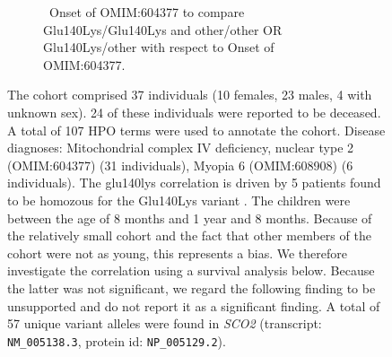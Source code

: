 \begin{figure}[htbp]
\vspace{2em}

\begin{subfigure}[b]{0.95\textwidth}
\captionsetup{justification=raggedright,singlelinecheck=false}
\caption{ Onset of OMIM:604377 to compare Glu140Lys/Glu140Lys and other/other OR Glu140Lys/other with respect to Onset of OMIM:604377. }
\end{subfigure}

\vspace{2em}

\caption{ The cohort comprised 37 individuals (10 females, 23 males, 4 with unknown sex). 24 of these individuals were reported to be deceased. 
A total of 107 HPO terms were used to annotate the cohort. Disease diagnoses: Mitochondrial complex IV deficiency, nuclear type 2 (OMIM:604377) (31 individuals), 
Myopia 6 (OMIM:608908) (6 individuals). The glu140lys correlation is driven by 5 patients found to be homozous for the Glu140Lys variant \cite{PMID_15499950}. 
The children were between the age of 8 months and 1 year and 8 months. Because of the relatively small cohort and the fact that other members of the cohort were not as young, this represents a bias. We therefore investigate the correlation using a survival analysis below. Because the latter was not significant, we regard the following finding to be unsupported and do not report it as a significant finding.  A total of 57 unique variant alleles were found in \textit{SCO2} (transcript: \texttt{NM\_005138.3}, protein id: \texttt{NP\_005129.2}).}
\end{figure}
